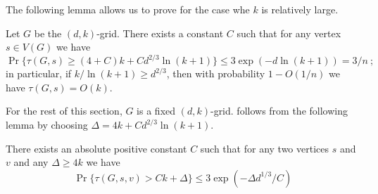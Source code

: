 \documentclass{patmorin}
\begin{document}
The following lemma allows us to prove 
for the case whe $k$ is relatively large.


\begin{lem}
Let $G$ be the $(d,k)$-grid.  There exists a constant $C$ such that for
any vertex $s\in V(G)$ we have
\[
\Pr \{ \tau(G,s) \geq (4+C)k + Cd^{2/3}\ln(k+1) \} 
\leq
3 \exp (-d\ln(k+1)) =3/n \:;
\]
in particular, if $k/\ln(k+1) \geq d^{2/3}$,
then with probability $1-O(1/n)$ we have
$\tau(G,s)=O(k)$.
\end{lem}

For the rest of this section, $G$ is a fixed $(d,k)$-grid.
 follows from the following lemma by choosing $\Delta =
4k+ Cd^{2/3}\ln(k+1)$.

\begin{lem}
  There exists an absolute positive constant $C$ such that for any two
  vertices $s$  and $v$ and any $\Delta\geq 4k$ we have
  \begin{equation}
  \Pr \{ \tau(G,s,v) > Ck + \Delta\} 
        \leq 3 \exp\left(-{\Delta d^{1/3}}/C\right)
  \label{hypercube:formula}
  \end{equation}
\end{lem}
\end{document}
